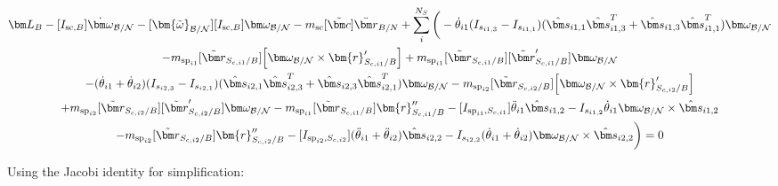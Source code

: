 \begin{multline}
	\bm L_B -[I_{\text{sc},B}] \dot{\bm\omega}_{\cal B/N} -[\bm{\tilde{\omega}}_{\cal B/N}] [I_{\text{sc},B}] \bm\omega_{\cal B/N}
	- m_{\text{sc}} [\tilde{\bm c}] \ddot{\bm r}_{B/N}
	+ \sum\limits_{i}^{N_S}\bigg( -\dot{\theta}_{i1} (I_{s_{i1,3}} - I_{s_{i1,1}})( \hat{\bm s}_{i1,1} \hat{\bm s}_{i1,3}^T + \hat{\bm s}_{i1,3} \hat{\bm s}_{i1,1}^T) \bm \omega_{\cal{B/N}} \\
	- m_{\text{sp}_{i1}} [\tilde{{\bm r}}_{S_{c,i1}/B}] \Big[\bm\omega_{\cal B/N} \times \bm{r}'_{S_{c,i1}/B}\Big] + m_{\text{sp}_{i1}} [\tilde{{\bm r}}_{S_{c,i1}/B}] [\tilde{{\bm r}}'_{S_{c,i1}/B}] \bm\omega_{\cal B/N} \\
	-(\dot{\theta}_{i1}  + \dot{\theta}_{i2})(I_{s_{i2,3}} - I_{s_{i2,1}}) (\hat{\bm s}_{i2,1} \hat{\bm s}_{i2,3}^T + \hat{\bm s}_{i2,3} \hat{\bm s}_{i2,1}^T) \bm \omega_{\cal{B/N}}
	- m_{\text{sp}_{i2}} [\tilde{{\bm r}}_{S_{c,i2}/B}] \Big[ \bm\omega_{\cal B/N} \times \bm{r}'_{S_{c,i2}/B}\Big]\\
	+  m_{\text{sp}_{i2}} [\tilde{{\bm r}}_{S_{c,i2}/B}] [\tilde{{\bm r}}'_{S_{c,i2}/B}] \bm\omega_{\cal B/N}
	- m_{\text{sp}_{i1}} [\tilde{{\bm r}}_{S_{c,i1}/B}] \bm{r}''_{S_{c,i1}/B}
	-[I_{\text{sp}_{i1},S_{c,i1}}] \ddot{\theta}_{i1} \hat{\bm s}_{i1,2}
	-I_{s_{i1,2}} \dot{\theta}_{i1} \bm \omega_{\cal{B/N}} \times \hat{\bm s}_{i1,2}
	\\
	- m_{\text{sp}_{i2}} [\tilde{{\bm r}}_{S_{c,i2}/B}] \bm{r}''_{S_{c,i2}/B}
	-[I_{\text{sp}_{i2},S_{c,i2}}] (\ddot{\theta}_{i1}  + \ddot{\theta}_{i2})\hat{\bm s}_{i2,2}
	-I_{s_{i2,2}}  (\dot{\theta}_{i1}  + \dot{\theta}_{i2}) \bm \omega_{\cal{B/N}} \times \hat{\bm s}_{i2,2} \bigg) = 0
\end{multline}

Using the Jacobi identity for simplification:

